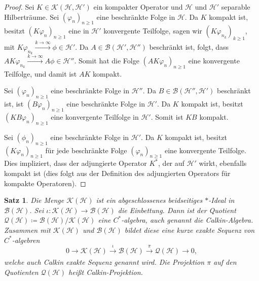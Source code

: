 \documentclass[11pt, hidelinks]{article}
\newcommand{\h}{\mathcal{H}}
\numberwithin{conj}{section}
\newtheorem{theorem}[conj]{Satz}
\begin{document}
\begin{proof}
Sei \( K \in \mathcal{K}(\h, \h') \) ein kompakter Operator und \( \h \) und \( \h' \) separable Hilberträume. Sei \( (\varphi_n)_{n \geq 1} \) eine beschränkte Folge in \( \h \). Da \( K \) kompakt ist, besitzt \( (K\varphi_n)_{n \geq 1} \) eine in \( \h' \) konvergente Teilfolge, sagen wir \( (K\varphi_{n_k})_{k \geq 1} \), mit \( K\varphi_{n_k} \xrightarrow[]{k \rightarrow \infty} \phi \in \h' \). Da \( A \in \mathcal{B}(\h', \h'') \) beschränkt ist, folgt, dass \( A K\varphi_{n_k} \xrightarrow[]{k \rightarrow \infty} A\phi \in \h'' \). Somit hat die Folge \( (AK\varphi_n)_{n \geq 1} \) eine konvergente Teilfolge, und damit ist \( AK \) kompakt.

Sei \( (\varphi_n)_{n \geq 1} \) eine beschränkte Folge in \( \h'' \). Da \( B \in \mathcal{B}(\h'', \h') \) beschränkt ist, ist \( (B\varphi_n)_{n \geq 1} \) eine beschränkte Folge in \( \h' \). Da \( K \) kompakt ist, besitzt \( (KB\varphi_n)_{n \geq 1} \) eine konvergente Teilfolge in \( \h' \). Somit ist \( KB \) kompakt.

Sei \( (\phi_n)_{n \geq 1} \) eine beschränkte Folge in \( \h' \). Da \( K \) kompakt ist, besitzt \( (K\varphi_n)_{n \geq 1} \) für jede beschränkte Folge \( (\varphi_n)_{n \geq 1} \) eine konvergente Teilfolge. Dies impliziert, dass der adjungierte Operator \( K^\ast \), der auf \( \h' \) wirkt, ebenfalls kompakt ist (dies folgt aus der Definition des adjungierten Operators für kompakte Operatoren).
\end{proof}

\begin{theorem}
Die Menge $\mathcal{K}(\h)$ ist ein abgeschlossenes beidseitiges $\ast$-Ideal in $\mathcal{B}(\h)$. Sei $\iota: \mathcal{K}(\h) \to \mathcal{B}(\h)$ die Einbettung. Dann ist der Quotient $\mathcal{Q}(\h) \coloneq \mathcal{B}(\h)/\mathcal{K}(\h)$ eine $C^\ast$-algebra, auch genannt die Calkin-Algebra. Zusammen mit $\mathcal{K}(\h)$ und $\mathcal{B}(\h)$ bildet diese eine kurze exakte Sequenz von $C^\ast$-algebren
\begin{equation}
    0 \to \mathcal{K}(\h) \xrightarrow[]{\iota} \mathcal{B}(\h) \xrightarrow[]{\pi} \mathcal{Q}(\h) \to 0,
\end{equation}
welche auch Calkin exakte Sequenz genannt wird. Die Projektion $\pi$ auf den Quotienten $\mathcal{Q}(\h)$ heißt Calkin-Projektion.
\end{theorem}
\end{document}
